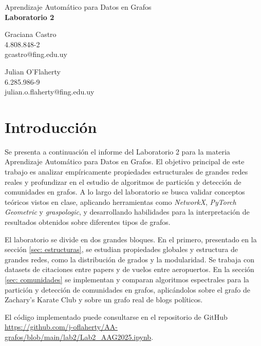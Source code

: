 \documentclass{article}
\begin{document}
\begin{center}
    {\Large Aprendizaje Automático para Datos en Grafos} \\
    {\LARGE \textbf{Laboratorio 2}} \\
    \vspace{2em}
    \begin{minipage}{0.45\textwidth}
        \centering
        Graciana Castro \\
        4.808.848-2 \\
        gcastro@fing.edu.uy
    \end{minipage}
    \hfill
    \begin{minipage}{0.45\textwidth}
        \centering
        Julian O'Flaherty \\
        6.285.986-9 \\
        julian.o.flaherty@fing.edu.uy
    \end{minipage}
\end{center}


\section{Introducción}

Se presenta a continuación el informe del Laboratorio 2 para la materia Aprendizaje Automático para Datos en Grafos. El objetivo principal de este trabajo es analizar empíricamente propiedades estructurales de grandes redes reales y profundizar en el estudio de algoritmos de partición y detección de comunidades en grafos. A lo largo del laboratorio se busca validar conceptos teóricos vistos en clase, aplicando herramientas como \textit{NetworkX}, \textit{PyTorch Geometric} y \textit{graspologic}, y desarrollando habilidades para la interpretación de resultados obtenidos sobre diferentes tipos de grafos.

El laboratorio se divide en dos grandes bloques. En el primero, presentado en la sección \ref{sec: estructuras}, se estudian propiedades globales y estructura de grandes redes, como la distribución de grados y la modularidad. Se trabaja con datasets de citaciones entre papers y de vuelos entre aeropuertos. En la sección \ref{sec: comunidades} se implementan y comparan algoritmos espectrales para la partición y detección de comunidades en grafos, aplicándolos sobre el grafo de Zachary's Karate Club y sobre un grafo real de blogs políticos.

El código implementado puede consultarse en el repositorio de GitHub \url{https://github.com/j-oflaherty/AA-grafos/blob/main/lab2/Lab2_AAG2025.ipynb}.
\end{document}
